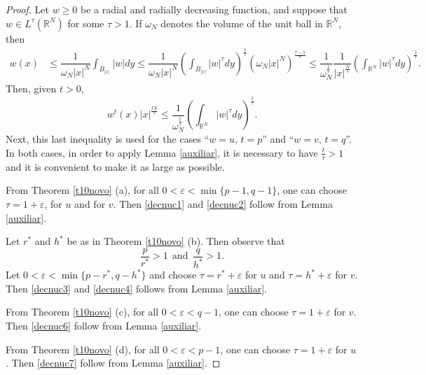 \documentclass[12pt,a4paper]{article}
\numberwithin{equation}{section}
\begin{document}
    
\begin{proof}
    Let $w\geq0$ be a radial and radially decreasing function, and suppose that $w\in L^\tau (\mathbb{R}^N)$ for some $\tau > 1$. If $\omega_N$ denotes the volume of the unit ball in $\mathbb{R}^N$, then
    \begin{align*}
        w(x) & \leq \dfrac{1}{\omega_N |x|^N} \int_{B_{|x|}} |w| dy \leq \dfrac{1}{\omega_N |x|^N} \left(\int_{B_{|x|}} |w|^\tau dy\right)^{\frac{1}{\tau}}\left(\omega_N |x|^N\right)^{\frac{\tau -1}{\tau}} \leq \dfrac{1}{\omega_{N}^{\frac{1}{\tau}}}\dfrac{1}{|x|^{\frac{N}{\tau}}}\left(\int_{\mathbb{R}^N} |w|^\tau dy \right)^{\frac{1}{\tau}}.
    \end{align*}
    Then, given $t>0$,
    \[
w^t(x) |x|^{\frac{tN}{\tau}} \leq \dfrac{1}{\omega_N^{\frac{t}{\tau}}}\left(\int_{\mathbb{R}^N} |w|^\tau dy \right)^{\frac{t}{\tau}}.
    \]
Next, this last inequality is used for the cases ``$w=u, \,t=p$'' and ``$w=v, \, t=q$''. In both cases, in order to apply Lemma \ref{auxiliar}, it is necessary to have $\frac{t}{\tau}>1$ and it is convenient to make it as large as possible.

\medbreak
     From Theorem \ref{t10novo} (a), for all $0 < \varepsilon < \min\{p-1, q-1\}$, one can choose $\tau = 1+\varepsilon$, for $u$ and for $v$. Then \eqref{decnuc1} and \eqref{decnuc2} follow from Lemma \ref{auxiliar}.

\medbreak
     Let $r^*$ and $h^*$ be as in Theorem \ref{t10novo} (b). Then observe that 
    \[
      \dfrac{p}{r^*}>1  \ \ \text{and} \ \ \dfrac{q}{h^*}>1.
    \]
Let $0<\varepsilon< \min\{p - r^{\ast}, q- h^{\ast}\}$ and choose $\tau = r^*+ \varepsilon$ for $u$ and $\tau = h^{\ast}+ \varepsilon$ for $v$. Then \eqref{decnuc3} and \eqref{decnuc4}  follows from Lemma \ref{auxiliar}.

\medbreak
     From Theorem \ref{t10novo} (c), for all $0 < \varepsilon < q-1$, one can choose $\tau = 1+\varepsilon$ for $v$. Then \eqref{decnuc6} follow from Lemma \ref{auxiliar}.

\medbreak
     From Theorem \ref{t10novo} (d), for all $0 < \varepsilon < p-1$, one can choose $\tau = 1+\varepsilon$ for $u$. Then \eqref{decnuc7} follow from Lemma \ref{auxiliar}.
\end{proof}
\end{document}
